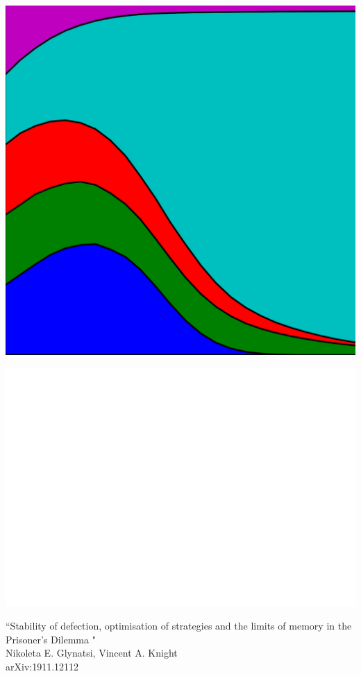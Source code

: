 \documentclass{beamer}
\begin{document}
\begin{frame}
    \begin{center}
        \includegraphics[width=.25\textwidth]{static/axelrod-logo.png}
    \end{center}
\end{frame}

\begin{frame}
    \begin{center}
    \includegraphics[width=.8\textwidth]{static/mem_one_against_longer_memory.png}
    \end{center}
\end{frame}

\begin{frame}
    \begin{center}
        \large{``Stability of defection, optimisation of strategies and the limits of memory in the Prisoner's Dilemma "} \\ \vspace{.5cm}
        \footnotesize{Nikoleta E. Glynatsi, Vincent A. Knight} \\ \vspace{.5cm}
        \footnotesize{arXiv:1911.12112}
    \end{center}
\end{frame}
\end{document}
